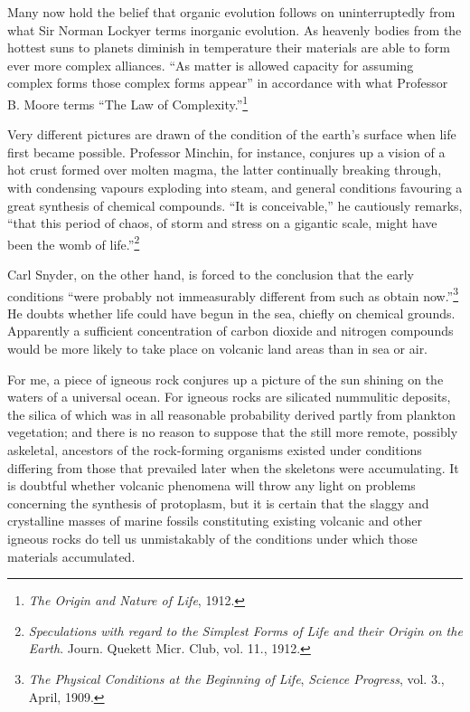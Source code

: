 \documentclass[a4paper, 12pt, oneside]{article}
\begin{document}
Many now hold the belief that organic evolution follows on uninterruptedly from what Sir Norman Lockyer terms inorganic evolution. As heavenly bodies from the hottest suns to planets diminish in temperature their materials are able to form ever more complex alliances. ``As matter is allowed capacity for assuming complex forms those complex forms appear'' in accordance with what Professor B. Moore terms ``The Law of Complexity.''\footnote{\emph{The Origin and Nature of Life}, 1912.}

Very different pictures are drawn of the condition of the earth's surface when life first became possible. Professor Minchin, for instance, conjures up a vision of a hot crust formed over molten magma, the latter continually breaking through, with condensing vapours exploding into steam, and general conditions favouring a great synthesis of chemical compounds. ``It is conceivable,'' he cautiously remarks, ``that this period of chaos, of storm and stress on a gigantic scale, might have been the womb of life.''\footnote{\emph{Speculations with regard to the Simplest Forms of Life and their Origin on the Earth}. Journ. Quekett Micr. Club, vol. 11., 1912.}

Carl Snyder, on the other hand, is forced to the conclusion that the early conditions ``were probably not immeasurably different from such as obtain now.''\footnote{\emph{The Physical Conditions at the Beginning of Life}, \emph{Science Progress}, vol. 3., April, 1909.} He doubts whether life could have begun in the sea, chiefly on chemical grounds. Apparently a sufficient concentration of carbon dioxide and nitrogen compounds would be more likely to take place on volcanic land areas than in sea or air.

For me, a piece of igneous rock conjures up a picture of the sun shining on the waters of a universal ocean. For igneous rocks are silicated nummulitic deposits, the silica of which was in all reasonable probability derived partly from plankton vegetation; and there is no reason to suppose that the still more remote, possibly askeletal, ancestors of the rock-forming organisms existed under conditions differing from those that prevailed later when the skeletons were accumulating. It is doubtful whether volcanic phenomena will throw any light on problems concerning the synthesis of protoplasm, but it is certain that the slaggy and crystalline masses of marine fossils constituting existing volcanic and other igneous rocks do tell us unmistakably of the conditions under which those materials accumulated.
\end{document}

